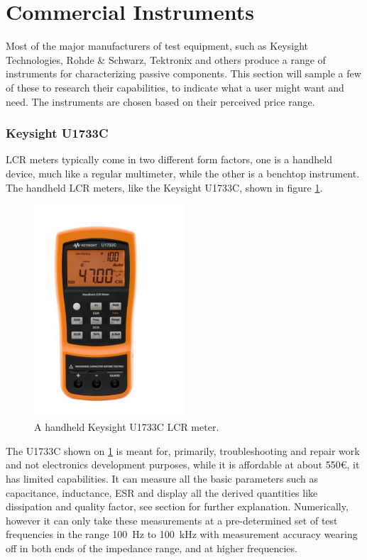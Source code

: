\section{Commercial Instruments} \label{sec:CommercialImpedanceMeasurement}
Most of the major manufacturers of test equipment, such as Keysight Technologies, Rohde \& Schwarz, Tektronix and others produce a range of instruments for characterizing passive components. This section will sample a few of these to research their capabilities, to indicate what a user might want and need. The instruments are chosen based on their perceived price range. 


\subsubsection*{Keysight U1733C}
LCR meters typically come in two different form factors, one is a handheld device, much like a regular multimeter, while the other is a benchtop instrument. The handheld LCR meters, like the Keysight U1733C\cite{KeysightU1733C}, shown in figure \ref{fig:2_2_U1733C}.
\begin{figure}[H]
    \centering
    \includegraphics[clip, trim=0 50 0 50, width=0.5\textwidth]{Sections/2_ProblemAnalysis/FIgures/KeysightU1733C.pdf}
    \caption{A handheld Keysight U1733C LCR meter.\cite{KeysightU1733C}}
    \label{fig:2_2_U1733C}
\end{figure}
The U1733C shown on \ref{fig:2_2_U1733C} is meant for, primarily, troubleshooting and repair work and not electronics development purposes, while it is affordable at about 550€, it has limited capabilities. It can measure all the basic parameters such as capacitance, inductance, ESR and display all the derived quantities like dissipation and quality factor, see section  for further explanation. Numerically, however it can only take these measurements at a pre-determined set of test frequencies in the range \SI[]{100}{\hertz} to \SI[]{100}{\kilo\hertz} with measurement accuracy wearing off in both ends of the impedance range, and at higher frequencies.

